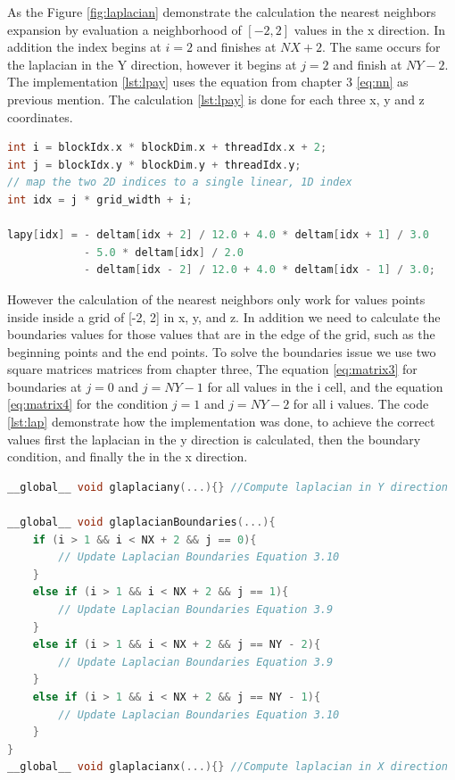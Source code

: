 As the Figure \ref{fig:laplacian} demonstrate the calculation the nearest neighbors expansion by evaluation a neighborhood of $[-2, 2]$ values in the x direction. In addition the index begins at $i = 2$ and finishes at $NX + 2$. The same occurs for the laplacian in the Y direction, however it begins at $j = 2$ and finish at $NY -2$.  The implementation \ref{lst:lpay} uses the equation from chapter 3 \ref{eq:nn} as previous mention. The calculation \ref{lst:lpay} is done for each three x, y and z coordinates. 

\begin{lstlisting}[language=C++, label={lst:lpay}, caption={Laplacian X using global memory}]
int i = blockIdx.x * blockDim.x + threadIdx.x + 2;
int j = blockIdx.y * blockDim.y + threadIdx.y;
// map the two 2D indices to a single linear, 1D index
int idx = j * grid_width + i;

lapy[idx] = - deltam[idx + 2] / 12.0 + 4.0 * deltam[idx + 1] / 3.0
			- 5.0 * deltam[idx] / 2.0
			- deltam[idx - 2] / 12.0 + 4.0 * deltam[idx - 1] / 3.0;	
\end{lstlisting}


However the calculation of the nearest neighbors only work for values points inside  inside a grid of [-2, 2] in x, y, and z. In addition we need to calculate the boundaries values for those values that are in the edge of the grid, such as the beginning points and the end points. To solve the boundaries issue we use two square matrices matrices from chapter three, The equation \ref{eq:matrix3} for boundaries at $j = 0$ and $j = NY - 1$ for all values in the i cell, and the equation \ref{eq:matrix4} for the condition $j = 1$ and $j = NY - 2$ for all i values. The code \ref{lst:lap} demonstrate how the implementation was done, to achieve the correct values first the laplacian in the y direction is calculated, then the boundary condition, and finally the in the x direction. 

\begin{lstlisting}[language=C++, label={lst:lap}, caption={Evaluation of Laplacian X, Y with boundary condition}]
__global__ void glaplaciany(...){} //Compute laplacian in Y direction

__global__ void glaplacianBoundaries(...){
    if (i > 1 && i < NX + 2 && j == 0){
     	// Update Laplacian Boundaries Equation 3.10
    }
    else if (i > 1 && i < NX + 2 && j == 1){
  		// Update Laplacian Boundaries Equation 3.9
    }
    else if (i > 1 && i < NX + 2 && j == NY - 2){
        // Update Laplacian Boundaries Equation 3.9
    }
    else if (i > 1 && i < NX + 2 && j == NY - 1){
        // Update Laplacian Boundaries Equation 3.10
    }
}
__global__ void glaplacianx(...){} //Compute laplacian in X direction
\end{lstlisting}

